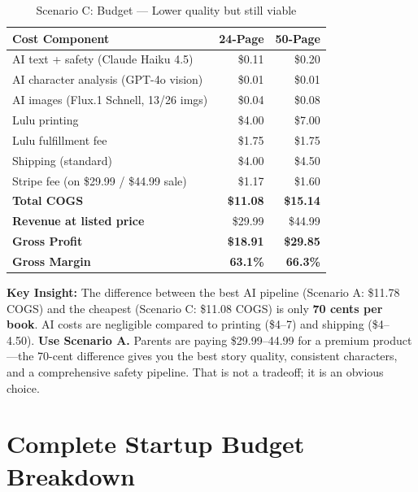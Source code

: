 \documentclass[12pt, letterpaper, oneside]{book}
\begin{document}
\begin{table}[H]
\centering
\begin{tabular}{lrr}
\toprule
\textbf{Cost Component} & \textbf{24-Page} & \textbf{50-Page} \\
\midrule
AI text + safety (Claude Haiku 4.5) & \$0.11 & \$0.20 \\
AI character analysis (GPT-4o vision) & \$0.01 & \$0.01 \\
AI images (Flux.1 Schnell, 13/26 imgs) & \$0.04 & \$0.08 \\
Lulu printing & \$4.00 & \$7.00 \\
Lulu fulfillment fee & \$1.75 & \$1.75 \\
Shipping (standard) & \$4.00 & \$4.50 \\
Stripe fee (on \$29.99 / \$44.99 sale) & \$1.17 & \$1.60 \\
\midrule
\textbf{Total COGS} & \textbf{\$11.08} & \textbf{\$15.14} \\
\textbf{Revenue at listed price} & \$29.99 & \$44.99 \\
\textbf{Gross Profit} & \textcolor{success}{\textbf{\$18.91}} & \textcolor{success}{\textbf{\$29.85}} \\
\textbf{Gross Margin} & \textcolor{success}{\textbf{63.1\%}} & \textcolor{success}{\textbf{66.3\%}} \\
\bottomrule
\end{tabular}
\caption{Scenario C: Budget --- Lower quality but still viable}
\end{table}

\begin{successbox}
\textbf{Key Insight:} The difference between the best AI pipeline (Scenario A: \$11.78 COGS) and the cheapest (Scenario C: \$11.08 COGS) is only \textbf{70 cents per book}. AI costs are negligible compared to printing (\$4--7) and shipping (\$4--4.50). \textbf{Use Scenario A.} Parents are paying \$29.99--44.99 for a premium product---the 70-cent difference gives you the best story quality, consistent characters, and a comprehensive safety pipeline. That is not a tradeoff; it is an obvious choice.
\end{successbox}


\chapter{Complete Startup Budget Breakdown}
\end{document}
